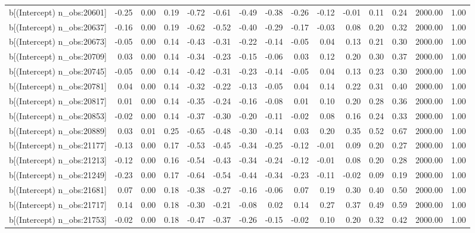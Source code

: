 \begin{table}[ht]
\begin{tabular}{rrrrrrrrrrrrrrr}
  b[(Intercept) n\_obs:20601] & -0.25 & 0.00 & 0.19 & -0.72 & -0.61 & -0.49 & -0.38 & -0.26 & -0.12 & -0.01 & 0.11 & 0.24 & 2000.00 & 1.00 \\ 
  b[(Intercept) n\_obs:20637] & -0.16 & 0.00 & 0.19 & -0.62 & -0.52 & -0.40 & -0.29 & -0.17 & -0.03 & 0.08 & 0.20 & 0.32 & 2000.00 & 1.00 \\ 
  b[(Intercept) n\_obs:20673] & -0.05 & 0.00 & 0.14 & -0.43 & -0.31 & -0.22 & -0.14 & -0.05 & 0.04 & 0.13 & 0.21 & 0.30 & 2000.00 & 1.00 \\ 
  b[(Intercept) n\_obs:20709] & 0.03 & 0.00 & 0.14 & -0.34 & -0.23 & -0.15 & -0.06 & 0.03 & 0.12 & 0.20 & 0.30 & 0.37 & 2000.00 & 1.00 \\ 
  b[(Intercept) n\_obs:20745] & -0.05 & 0.00 & 0.14 & -0.42 & -0.31 & -0.23 & -0.14 & -0.05 & 0.04 & 0.13 & 0.23 & 0.30 & 2000.00 & 1.00 \\ 
  b[(Intercept) n\_obs:20781] & 0.04 & 0.00 & 0.14 & -0.32 & -0.22 & -0.13 & -0.05 & 0.04 & 0.14 & 0.22 & 0.31 & 0.40 & 2000.00 & 1.00 \\ 
  b[(Intercept) n\_obs:20817] & 0.01 & 0.00 & 0.14 & -0.35 & -0.24 & -0.16 & -0.08 & 0.01 & 0.10 & 0.20 & 0.28 & 0.36 & 2000.00 & 1.00 \\ 
  b[(Intercept) n\_obs:20853] & -0.02 & 0.00 & 0.14 & -0.37 & -0.30 & -0.20 & -0.11 & -0.02 & 0.08 & 0.16 & 0.24 & 0.33 & 2000.00 & 1.00 \\ 
  b[(Intercept) n\_obs:20889] & 0.03 & 0.01 & 0.25 & -0.65 & -0.48 & -0.30 & -0.14 & 0.03 & 0.20 & 0.35 & 0.52 & 0.67 & 2000.00 & 1.00 \\ 
  b[(Intercept) n\_obs:21177] & -0.13 & 0.00 & 0.17 & -0.53 & -0.45 & -0.34 & -0.25 & -0.12 & -0.01 & 0.09 & 0.20 & 0.27 & 2000.00 & 1.00 \\ 
  b[(Intercept) n\_obs:21213] & -0.12 & 0.00 & 0.16 & -0.54 & -0.43 & -0.34 & -0.24 & -0.12 & -0.01 & 0.08 & 0.20 & 0.28 & 2000.00 & 1.00 \\ 
  b[(Intercept) n\_obs:21249] & -0.23 & 0.00 & 0.17 & -0.64 & -0.54 & -0.44 & -0.34 & -0.23 & -0.11 & -0.02 & 0.09 & 0.19 & 2000.00 & 1.00 \\ 
  b[(Intercept) n\_obs:21681] & 0.07 & 0.00 & 0.18 & -0.38 & -0.27 & -0.16 & -0.06 & 0.07 & 0.19 & 0.30 & 0.40 & 0.50 & 2000.00 & 1.00 \\ 
  b[(Intercept) n\_obs:21717] & 0.14 & 0.00 & 0.18 & -0.30 & -0.21 & -0.08 & 0.02 & 0.14 & 0.27 & 0.37 & 0.49 & 0.59 & 2000.00 & 1.00 \\ 
  b[(Intercept) n\_obs:21753] & -0.02 & 0.00 & 0.18 & -0.47 & -0.37 & -0.26 & -0.15 & -0.02 & 0.10 & 0.20 & 0.32 & 0.42 & 2000.00 & 1.00 \\ 

\end{tabular}
\end{table}
